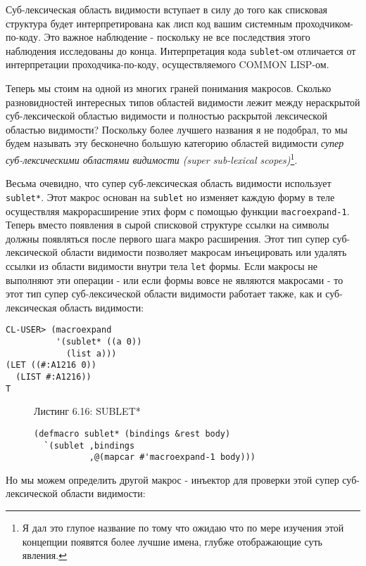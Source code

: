 Суб-лексическая область видимости вступает в силу до того как списковая структура будет интерпретирована как лисп код вашим системным проходчиком-по-коду. Это важное наблюдение - поскольку не все последствия этого наблюдения исследованы до конца. Интерпретация кода \verb"sublet"-ом отличается от интерпретации проходчика-по-коду, осуществляемого COMMON LISP-ом.

Теперь мы стоим на одной из многих граней понимания макросов. Сколько разновидностей интересных типов областей видимости лежит между нераскрытой суб-лексической областью видимости и полностью раскрытой лексической областью видимости? Поскольку более лучшего названия я не подобрал, то мы будем называть эту бесконечно большую категорию областей видимости \emph{супер суб-лексическими областями видимости (super sub-lexical scopes)}\footnote{Я дал это глупое название по тому что ожидаю что по мере изучения этой концепции появятся более лучшие имена, глубже отображающие суть явления.}.



Весьма очевидно, что супер суб-лексическая область видимости использует \verb"sublet*". Этот макрос основан на \verb"sublet" но изменяет каждую форму в теле осуществляя макрорасширение этих форм с помощью функции \verb"macroexpand-1". Теперь вместо появления в сырой списковой структуре ссылки на символы должны появляться после первого шага макро расширения. Этот тип супер суб-лексической области видимости позволяет макросам инъецировать или удалять ссылки из области видимости внутри тела \verb"let" формы. Если макросы не выполняют эти операции - или если формы вовсе не являются макросами - то этот тип супер суб-лексической области видимости работает также, как и суб-лексическая область видимости:

\begin{verbatim}
CL-USER> (macroexpand
          '(sublet* ((a 0))
            (list a)))
(LET ((#:A1216 0))
  (LIST #:A1216))
T
\end{verbatim}

\begin{figure}Листинг 6.16: SUBLET*\label{listing_6.16}
\listbegin
\begin{verbatim}
(defmacro sublet* (bindings &rest body)
  `(sublet ,bindings
           ,@(mapcar #'macroexpand-1 body)))
\end{verbatim}
\listend
\end{figure}

Но мы можем определить другой макрос - инъектор для проверки этой супер суб-лексической области видимости:

